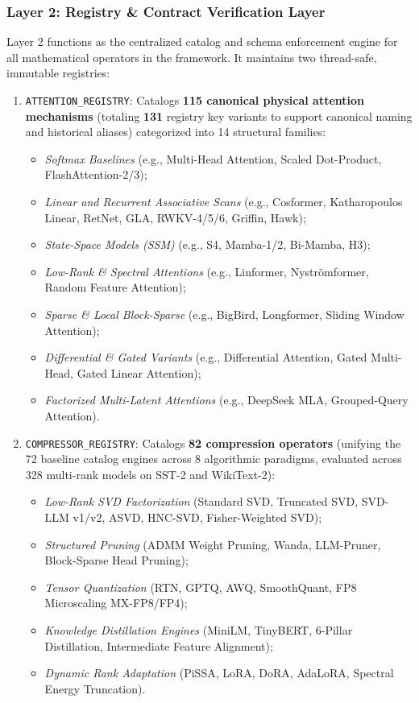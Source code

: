 \subsubsection{Layer 2: Registry \& Contract Verification Layer}
Layer 2 functions as the centralized catalog and schema enforcement engine for all mathematical operators in the framework. It maintains two thread-safe, immutable registries:
\begin{enumerate}
    \item \texttt{ATTENTION\_REGISTRY}: Catalogs \textbf{115 canonical physical attention mechanisms} (totaling \textbf{131} registry key variants to support canonical naming and historical aliases) categorized into 14 structural families:
    \begin{itemize}
        \item \textit{Softmax Baselines} (e.g., Multi-Head Attention, Scaled Dot-Product, FlashAttention-2/3);
        \item \textit{Linear and Recurrent Associative Scans} (e.g., Cosformer, Katharopoulos Linear, RetNet, GLA, RWKV-4/5/6, Griffin, Hawk);
        \item \textit{State-Space Models (SSM)} (e.g., S4, Mamba-1/2, Bi-Mamba, H3);
        \item \textit{Low-Rank \& Spectral Attentions} (e.g., Linformer, Nystr\"omformer, Random Feature Attention);
        \item \textit{Sparse \& Local Block-Sparse} (e.g., BigBird, Longformer, Sliding Window Attention);
        \item \textit{Differential \& Gated Variants} (e.g., Differential Attention, Gated Multi-Head, Gated Linear Attention);
        \item \textit{Factorized Multi-Latent Attentions} (e.g., DeepSeek MLA, Grouped-Query Attention).
    \end{itemize}
    \item \texttt{COMPRESSOR\_REGISTRY}: Catalogs \textbf{82 compression operators} (unifying the 72 baseline catalog engines across 8 algorithmic paradigms, evaluated across 328 multi-rank models on SST-2 and WikiText-2):
    \begin{itemize}
        \item \textit{Low-Rank SVD Factorization} (Standard SVD, Truncated SVD, SVD-LLM v1/v2, ASVD, HNC-SVD, Fisher-Weighted SVD);
        \item \textit{Structured Pruning} (ADMM Weight Pruning, Wanda, LLM-Pruner, Block-Sparse Head Pruning);
        \item \textit{Tensor Quantization} (RTN, GPTQ, AWQ, SmoothQuant, FP8 Microscaling MX-FP8/FP4);
        \item \textit{Knowledge Distillation Engines} (MiniLM, TinyBERT, 6-Pillar Distillation, Intermediate Feature Alignment);
        \item \textit{Dynamic Rank Adaptation} (PiSSA, LoRA, DoRA, AdaLoRA, Spectral Energy Truncation).
    \end{itemize}
\end{enumerate}

